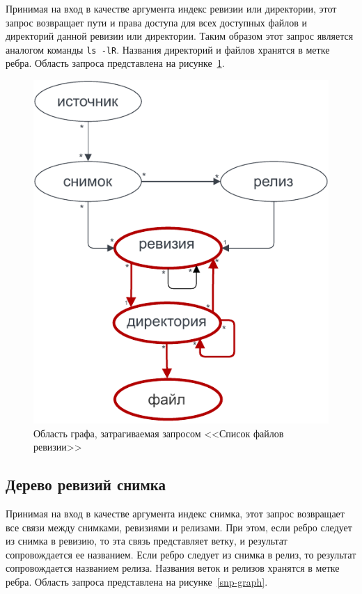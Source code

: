\documentclass[times,specification,annotation]{itmo-student-thesis}
\begin{document}
Принимая на вход в качестве аргумента индекс ревизии или директории, этот запрос возвращает пути и права доступа для всех доступных файлов и директорий данной ревизии или директории. Таким образом этот запрос является аналогом команды \texttt{ls -lR}. Названия директорий и файлов хранятся в метке ребра. Область запроса представлена на рисунке~\ref{rec-graph}.

\begin{figure}[!h]
\caption{Область графа, затрагиваемая запросом <<Список файлов ревизии>>}\label{rec-graph}
\centering
\includegraphics{img/rec-graph.pdf}
\end{figure}

\subsection{Дерево ревизий снимка}

Принимая на вход в качестве аргумента индекс снимка, этот запрос возвращает все связи между снимками, ревизиями и релизами. При этом, если ребро следует из снимка в ревизию, то эта связь представляет ветку, и результат сопровождается ее названием. Если ребро следует из снимка в релиз, то результат сопровождается названием релиза. Названия веток и релизов хранятся в метке ребра. Область запроса представлена на рисунке~\ref{snp-graph}.
\end{document}
